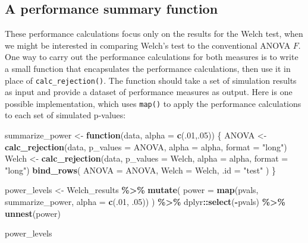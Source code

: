 \documentclass[
]{book}
\newenvironment{Shaded}{\begin{snugshade}}{\end{snugshade}}
\newcommand{\AttributeTok}[1]{\textcolor[rgb]{0.13,0.29,0.53}{#1}}
\newcommand{\ControlFlowTok}[1]{\textcolor[rgb]{0.13,0.29,0.53}{\textbf{#1}}}
\newcommand{\DecValTok}[1]{\textcolor[rgb]{0.00,0.00,0.81}{#1}}
\newcommand{\FunctionTok}[1]{\textcolor[rgb]{0.13,0.29,0.53}{\textbf{#1}}}
\newcommand{\NormalTok}[1]{#1}
\newcommand{\OtherTok}[1]{\textcolor[rgb]{0.56,0.35,0.01}{#1}}
\newcommand{\SpecialCharTok}[1]{\textcolor[rgb]{0.81,0.36,0.00}{\textbf{#1}}}
\newcommand{\StringTok}[1]{\textcolor[rgb]{0.31,0.60,0.02}{#1}}
\begin{document}
\subsection{A performance summary function}\label{a-performance-summary-function}

These performance calculations focus only on the results for the Welch test, when we might be interested in comparing Welch's test to the conventional ANOVA \(F\).
One way to carry out the performance calculations for both measures is to write a small function that encapsulates the performance calculations, then use it in place of \texttt{calc\_rejection()}.
The function should take a set of simulation results as input and provide a dataset of performance measures as output.
Here is one possible implementation, which uses \texttt{map()} to apply the performance calculations to each set of simulated p-values:

\begin{Shaded}
\begin{Highlighting}[]
\NormalTok{summarize\_power }\OtherTok{\textless{}{-}} \ControlFlowTok{function}\NormalTok{(data, }\AttributeTok{alpha =} \FunctionTok{c}\NormalTok{(.}\DecValTok{01}\NormalTok{,.}\DecValTok{05}\NormalTok{)) \{}
\NormalTok{  ANOVA }\OtherTok{\textless{}{-}} \FunctionTok{calc\_rejection}\NormalTok{(data, }\AttributeTok{p\_values =}\NormalTok{ ANOVA, }\AttributeTok{alpha =}\NormalTok{ alpha, }\AttributeTok{format =} \StringTok{"long"}\NormalTok{)}
\NormalTok{  Welch }\OtherTok{\textless{}{-}} \FunctionTok{calc\_rejection}\NormalTok{(data, }\AttributeTok{p\_values =}\NormalTok{ Welch, }\AttributeTok{alpha =}\NormalTok{ alpha, }\AttributeTok{format =} \StringTok{"long"}\NormalTok{)}
  \FunctionTok{bind\_rows}\NormalTok{(}
    \AttributeTok{ANOVA =}\NormalTok{ ANOVA, }
    \AttributeTok{Welch =}\NormalTok{ Welch,}
    \AttributeTok{.id =} \StringTok{"test"}
\NormalTok{  )}
\NormalTok{\} }

\NormalTok{power\_levels }\OtherTok{\textless{}{-}} 
\NormalTok{  Welch\_results }\SpecialCharTok{\%\textgreater{}\%}
  \FunctionTok{mutate}\NormalTok{(}
    \AttributeTok{power =} \FunctionTok{map}\NormalTok{(pvals, summarize\_power, }\AttributeTok{alpha =} \FunctionTok{c}\NormalTok{(.}\DecValTok{01}\NormalTok{, .}\DecValTok{05}\NormalTok{))}
\NormalTok{  ) }\SpecialCharTok{\%\textgreater{}\%}
\NormalTok{  dplyr}\SpecialCharTok{::}\FunctionTok{select}\NormalTok{(}\SpecialCharTok{{-}}\NormalTok{pvals) }\SpecialCharTok{\%\textgreater{}\%}
  \FunctionTok{unnest}\NormalTok{(power)}

\NormalTok{power\_levels}
\end{Highlighting}
\end{Shaded}
\end{document}
